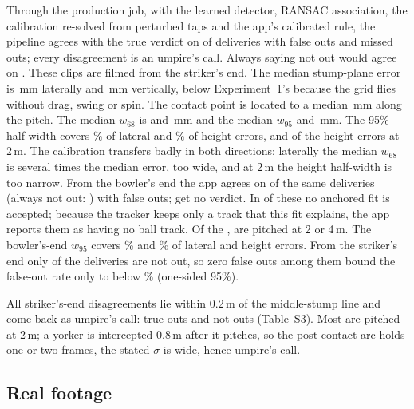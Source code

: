 \documentclass[journal]{IEEEtran}
\begin{document}
Through the production job, with the learned detector, RANSAC association, the calibration re-solved
from perturbed taps and the app's calibrated rule, the pipeline agrees with the true verdict on \EteAgree{} of \EteN{} deliveries with
\EteFalseOut{} false outs and \EteMissedOut{} missed outs; every disagreement is an umpire's call.
Always saying not out would agree on \EteNotOutTruth. These clips are filmed from the striker's end.
The median stump-plane error is \EteMedY\,mm laterally and \EteMedZ\,mm vertically, below Experiment~1's
because the grid flies without drag, swing or spin. The contact point is located to a median \EteMedContactX\,mm along the pitch. The median $w_{68}$ is \EteMedUY{} and
\EteMedUZ\,mm and the median $w_{95}$ \EteMedUNinetyfiveY{} and \EteMedUNinetyfiveZ\,mm. The 95\% half-width covers
\EteCoverNinetyfiveY\% of lateral and \EteCoverNinetyfiveZ\% of height errors, and \EteCoverZLenTwo{} of the
\EteCoverZLenTwoN{} height errors at 2\,m. The calibration transfers badly in both directions: laterally the median
$w_{68}$ is several times the median error, too wide, and at 2\,m the height half-width is too narrow.
From the bowler's end the app agrees on \EteBowlerAgree{} of the same deliveries (always not out: \EteBowlerNotOutTruth)
with \EteBowlerFalseOut{} false outs; \EteBowlerNoVerdict{} get no verdict. In \EteBowlerNoTrack{} of these no anchored fit is accepted; because the
tracker keeps only a track that this fit explains, the app reports them as having no ball track. Of the
\EteBowlerNoVerdict, \EteBowlerNoVerdictShort{} are pitched at 2 or 4\,m. The bowler's-end $w_{95}$ covers \EteBowlerCoverNinetyfiveY\% and \EteBowlerCoverNinetyfiveZ\% of lateral and height errors.
From the striker's end only \EteNotOutTruth{} of
the deliveries are not out, so zero false outs among them bound the false-out rate only to below
\EteFalseOutUpper\% (one-sided 95\%).

All striker's-end disagreements lie within 0.2\,m of the middle-stump line and come back as umpire's call: \EteOutToUmp{} true outs
and \EteNotOutToUmp{} not-outs (Table~S3). Most are pitched at 2\,m; a yorker is intercepted 0.8\,m after it
pitches, so the post-contact arc holds one or two frames, the stated $\sigma$ is wide, hence umpire's call.

\subsection{Real footage}

\begin{table}[t]
\centering
\caption{Experiment 3. Three net clips (test3 to test5, top to bottom), each on a pose from the stumps
alone (test3 with the pitch length pinned, test4 and test5 free), analysed on all frames and on the even and odd frames alone; no truth
exists. The $\pm$ half-width is $w_{95}$ of the bowler's-end rule (Section~\ref{sec:coverage}), with the
height bias removed. A free pitch length lies outside the calibrated domain. $\infty$: crossing
lost under perturbed taps. --: declined, no output. Halves are tracked separately, so their points can sum to more than the full-rate track's.}
\label{tab:real}
\scriptsize
\setlength{\tabcolsep}{3.5pt}

\end{table}
\end{document}
